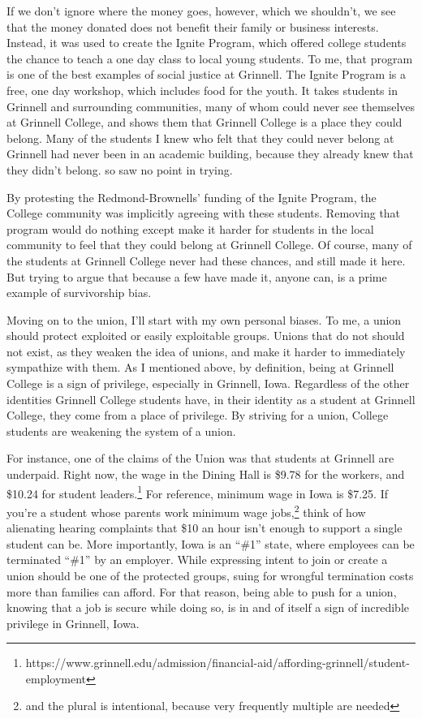 \documentclass[12pt]{article}[titlepage]
\newcommand{\say}[1]{``\#1''}
\newcommand{\1}{\={a}}
\newcommand{\2}{\={e}}
\newcommand{\3}{\={\i}}
\newcommand{\4}{\=o}
\newcommand{\5}{\=u}
\newcommand{\6}{\={A}}
\renewcommand{\,}{\textsuperscript{,}}
\begin{document}
If we don't ignore where the money goes, however, which we shouldn't, we see that the money donated does not benefit their family or business interests.
Instead, it was used to create the Ignite Program, which offered college students the chance to teach a one day class to local young students.
To me, that program is one of the best examples of social justice at Grinnell.
The Ignite Program is a free, one day workshop, which includes food for the youth.
It takes students in Grinnell and surrounding communities, many of whom could never see themselves at Grinnell College, and shows them that Grinnell College is a place they could belong.
Many of the students I knew who felt that they could never belong at Grinnell had never been in an academic building, because they already knew that they didn't belong. so saw no point in trying.

By protesting the Redmond-Brownells' funding of the Ignite Program, the College community was implicitly agreeing with these students.
Removing that program would do nothing except make it harder for students in the local community to feel that they could belong at Grinnell College.
Of course, many of the students at Grinnell College never had these chances, and still made it here.
But trying to argue that because a few have made it, anyone can, is a prime example of survivorship bias.

Moving on to the union, I'll start with my own personal biases.
To me, a union should protect exploited or easily exploitable groups.
Unions that do not should not exist, as they weaken the idea of unions, and make it harder to immediately sympathize with them.
As I mentioned above, by definition, being at Grinnell College is a sign of privilege, especially in Grinnell, Iowa.
Regardless of the other identities Grinnell College students have, in their identity as a student at Grinnell College, they come from a place of privilege.
By striving for a union, College students are weakening the system of a union.

For instance, one of the claims of the Union was that students at Grinnell are underpaid.
Right now, the wage in the Dining Hall is \$9.78 for the workers, and \$10.24 for student leaders.\footnote{https://www.grinnell.edu/admission/financial-aid/affording-grinnell/student-employment}
For reference, minimum wage in Iowa is \$7.25.
If you're a student whose parents work minimum wage jobs,\footnote{and the plural is intentional, because very frequently multiple are needed} think of how alienating hearing complaints that \$10 an hour isn't enough to support a single student can be.
More importantly, Iowa is an \say{at-will} state, where employees can be terminated \say{at will} by an employer.
While expressing intent to join or create a union should be one of the protected groups, suing for wrongful termination costs more than families can afford.
For that reason, being able to push for a union, knowing that a job is secure while doing so, is in and of itself a sign of incredible privilege in Grinnell, Iowa.
\end{document}
